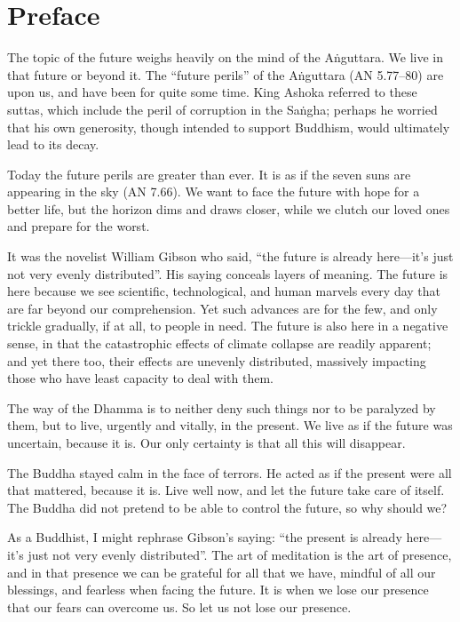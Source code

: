 \documentclass[12pt,openany]{book}%
\begin{document}
%
\chapter*{Preface}

The topic of the future weighs heavily on the mind of the \textsanskrit{Aṅguttara}. We live in that future or beyond it. The “future perils” of the \textsanskrit{Aṅguttara} (AN 5.77–80) are upon us, and have been for quite some time. King Ashoka referred to these suttas, which include the peril of corruption in the \textsanskrit{Saṅgha}; perhaps he worried that his own generosity, though intended to support Buddhism, would ultimately lead to its decay. 

Today the future perils are greater than ever. It is as if the seven suns are appearing in the sky (AN 7.66). We want to face the future with hope for a better life, but the horizon dims and draws closer, while we clutch our loved ones and prepare for the worst.

It was the novelist William Gibson who said, “the future is already here—it’s just not very evenly distributed”. His saying conceals layers of meaning. The future is here because we see scientific, technological, and human marvels every day that are far beyond our comprehension. Yet such advances are for the few, and only trickle gradually, if at all, to people in need. The future is also here in a negative sense, in that the catastrophic effects of climate collapse are readily apparent; and yet there too, their effects are unevenly distributed, massively impacting those who have least capacity to deal with them. 

The way of the Dhamma is to neither deny such things nor to be paralyzed by them, but to live, urgently and vitally, in the present. We live as if the future was uncertain, because it is. Our only certainty is that all this will disappear. 

The Buddha stayed calm in the face of terrors. He acted as if the present were all that mattered, because it is. Live well now, and let the future take care of itself. The Buddha did not pretend to be able to control the future, so why should we? 

As a Buddhist, I might rephrase Gibson’s saying: “the present is already here—it’s just not very evenly distributed”. The art of meditation is the art of presence, and in that presence we can be grateful for all that we have, mindful of all our blessings, and fearless when facing the future. It is when we lose our presence that our fears can overcome us. So let us not lose our presence. 
\end{document}
